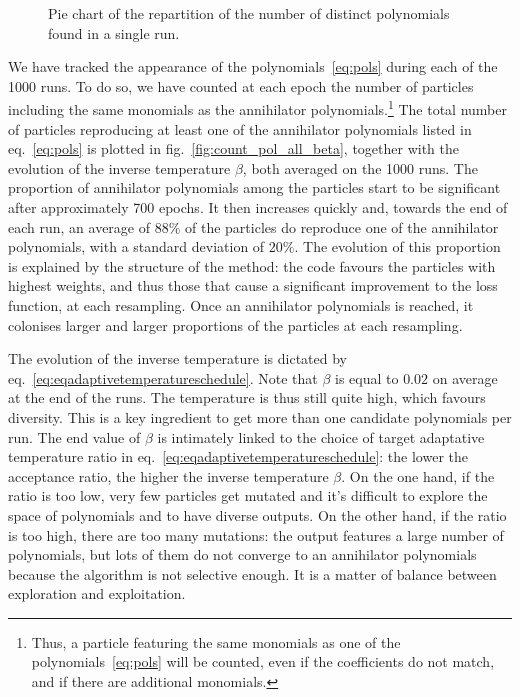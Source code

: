 \documentclass[11pt,a4paper]{article}
\begin{document}
	\begin{figure}[b!]
		\centering
		
		\caption{Pie chart of the repartition of the number of distinct polynomials found in a single run.}
		\label{fig:piechart}
	\end{figure}
	  
	We have tracked the appearance of the polynomials~\eqref{eq:pols} during each of the 1000 runs. To do so, we have counted at each epoch the number of particles including the same monomials as the annihilator polynomials.\footnote{Thus, a particle featuring the same monomials as one of the polynomials~\eqref{eq:pols} will be counted, even if the coefficients do not match, and if there are additional monomials.} The total number of particles reproducing at least one of the annihilator polynomials listed in eq.~\eqref{eq:pols} is plotted in fig.~\ref{fig:count_pol_all_beta}, together with the evolution of the inverse temperature $\beta$, both averaged on the 1000 runs. The proportion of annihilator polynomials among the particles start to be significant after approximately 700 epochs. It then increases quickly and, towards the end of each run, an average of $88\%$ of the particles do reproduce one of the annihilator polynomials, with a standard deviation of $20\%$. The evolution of this proportion is explained by the structure of the method: the code favours the particles with highest weights, and thus those that cause a significant improvement to the loss function, at each resampling. Once an annihilator polynomials is reached, it colonises larger and larger proportions of the particles at each resampling.

	The evolution of the inverse temperature is dictated by eq.~\eqref{eq:eqadaptivetemperatureschedule}. Note that $\beta$ is equal to $0.02$ on average at the end of the runs. The temperature is thus still quite high, which favours diversity. This is a key ingredient to get more than one candidate polynomials per run. The end value of $\beta$ is intimately linked to the choice of target adaptative temperature ratio in eq.~\eqref{eq:eqadaptivetemperatureschedule}: the lower the acceptance ratio, the higher the inverse temperature $\beta$. On the one hand, if the ratio is too low, very few particles get mutated and it's difficult to explore the space of polynomials and to have diverse outputs. On the other hand, if the ratio is too high, there are too many mutations: the output features a large number of polynomials, but lots of them do not converge to an annihilator polynomials because the algorithm is not selective enough. It is a matter of balance between exploration and exploitation.
\end{document}
